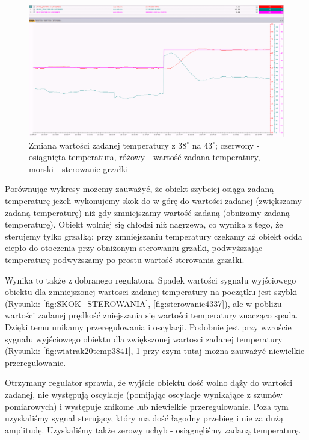 \documentclass[12pt, a4paper]{article}
\begin{document}
\begin{figure}[H]
	\centering
	\includegraphics[width=0.9\linewidth]{sterowanie3843}
	\caption{Zmiana wartości zadanej temperatury z  $38^\circ$ na $43^\circ$; czerwony - osiągnięta temperatura, różowy - wartość zadana temperatury, morski - sterowanie  grzałki}
	\label{fig:sterowanie3843}
\end{figure}

Porównując wykresy możemy zauważyć, że obiekt szybciej osiąga zadaną temperaturę jeżeli wykonujemy skok do w górę do wartości zadanej (zwiększamy zadaną temperaturę) niż gdy zmniejszamy wartość zadaną (obnizamy zadaną temperaturę). Obiekt wolniej się chłodzi niż nagrzewa, co wynika z tego, że sterujemy tylko grzałką: przy zmniejszaniu temperatury czekamy aż obiekt odda ciepło do otoczenia przy obniżonym sterowaniu grzałki, podwyższając temperaturę podwyższamy po prostu wartość sterowania grzałki.  

Wynika to także z dobranego regulatora. Spadek wartości sygnału wyjściowego obiektu dla zmniejszonej wartosci zadanej temperatury na początku jest szybki (Rysunki: \ref{fig:SKOK_STEROWANIA}, \ref{fig:sterowanie4337}), ale w pobliżu wartości zadanej prędkość zniejszania się wartości temperatury znacząco spada. Dzięki temu unikamy przeregulowania i oscylacji. Podobnie jest przy wzroście sygnału wyjściowego obiektu dla zwiększonej wartosci zadanej temperatury  (Rysunki: \ref{fig:wiatrak20temp3841}, \ref{fig:sterowanie3843} przy czym tutaj można zauważyć niewielkie przeregulowanie. 

Otrzymany regulator sprawia, że wyjście obiektu dość wolno dąży do wartości zadanej, nie występują oscylacje (pomijając oscylacje wynikające z szumów pomiarowych) i występuje znikome lub niewielkie przeregulowanie. Poza tym uzyskaliśmy sygnał sterujący, który ma dość łagodny przebieg i nie za dużą amplitudę. Uzyskaliśmy także zerowy uchyb - osiągnęliśmy zadaną temperaturę. 
\end{document}
